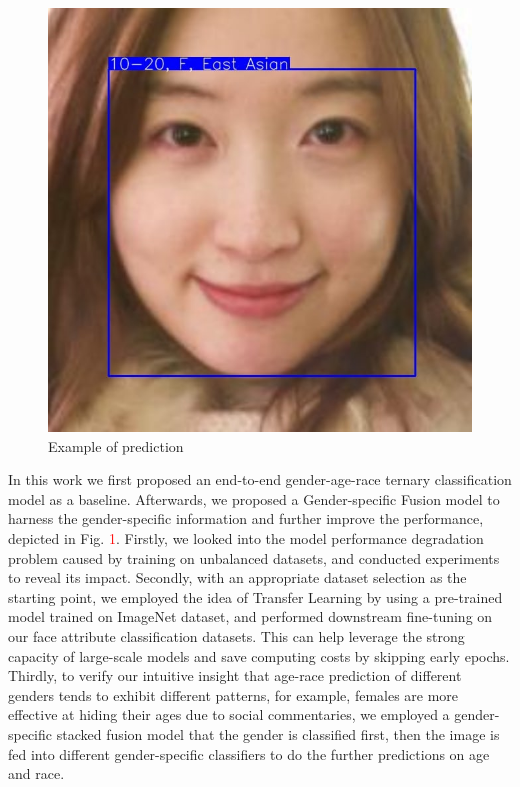 \documentclass[DIV=calc, paper=a4, fontsize=10pt, twocolumn]{article}
\begin{document}
	\begin{figure}[t]
		\centering
		\includegraphics[width=0.9\linewidth]{"./imgs/result_2_F_East_Asian_9220.jpg"}
		\caption{Example of prediction}
		\label{fig:result2meast-asian9220}
	\end{figure}
	
	In this work we first proposed an end-to-end gender-age-race ternary classification model as a baseline. Afterwards, we proposed a Gender-specific Fusion model to harness the gender-specific information and further improve the performance, depicted in Fig. \textcolor{red}{1}. Firstly, we looked into the model performance degradation problem caused by training on unbalanced datasets, and conducted experiments to reveal its impact. Secondly, with an appropriate dataset selection as the starting point, we employed the idea of Transfer Learning by using a pre-trained model trained on ImageNet dataset, and performed downstream fine-tuning on our face attribute classification datasets. This can help leverage the strong capacity of large-scale models and save computing costs by skipping early epochs. Thirdly, to verify our intuitive insight that age-race prediction of different genders tends to exhibit different patterns, for example, females are more effective at hiding their ages due to social commentaries, we employed a gender-specific stacked fusion model that the gender is classified first, then the image is fed into different gender-specific classifiers to do the further predictions on age and race. 
	
\end{document}
